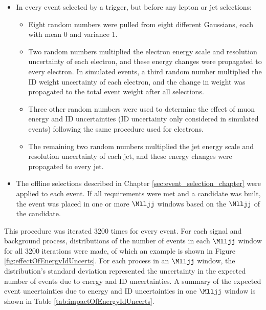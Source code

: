 \begin{itemize}
	\item In every event selected by a trigger, but before any lepton or jet selections:
	\begin{itemize}
		\item Eight random numbers were pulled from eight different Gaussians, each with mean 0 and variance 1.
		\item Two random numbers multiplied the electron energy scale and resolution uncertainty of each electron, and these 
			energy changes were propagated to every electron.  In simulated events, a third random number multiplied 
			the ID weight uncertainty of each electron, and the change in weight was propagated to the total event weight 
			after all selections.
		\item Three other random numbers were used to determine the effect of muon energy and ID uncertainties (ID uncertainty 
			only considered in simulated events) following the same procedure used for electrons.
		\item The remaining two random numbers multiplied the jet energy scale and resolution uncertainty of each jet, and 
			these energy changes were propagated to every jet.
	\end{itemize}
	\item The offline selections described in Chapter \ref{sec:event_selection_chapter} were applied to each event.  If all 
		requirements were met and a \WR candidate was built, the event was placed in one or more $\Mlljj$ windows based on 
		the $\Mlljj$ of the \WR candidate.
\end{itemize}

This procedure was iterated 3200 times for every event.  For each signal and background process, distributions 
of the number of events in each $\Mlljj$ window for all 3200 iterations were made, of which an example  
is shown in Figure \ref{fig:effectOfEnergyIdUncerts}.  For each process in an $\Mlljj$ window, the 
distribution's standard deviation represented the uncertainty in the expected number of events due 
to energy and ID uncertainties.  A summary of the expected event uncertainties due to energy and ID 
uncertainties in one $\Mlljj$ window is shown in Table \ref{tab:impactOfEnergyIdUncerts}.

